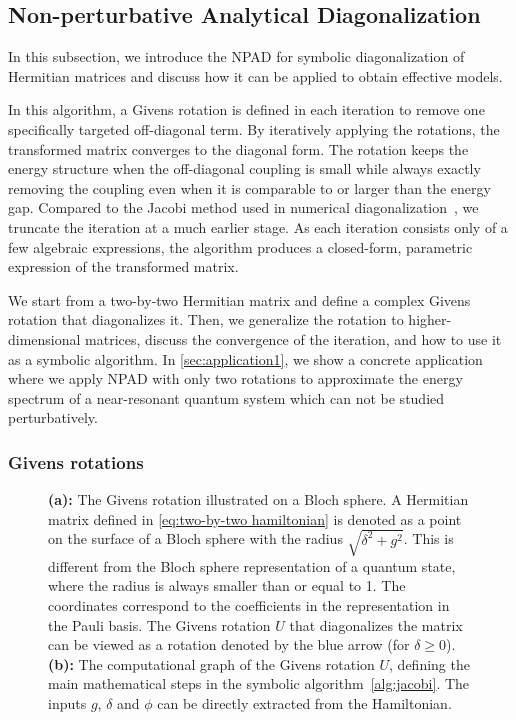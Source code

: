 \documentclass[%
 reprint,
 amsmath,amssymb,
 aps,
pra,
noeprint,
superscriptaddress,
]{revtex4-2}
\begin{document}
\subsection{Non-perturbative Analytical Diagonalization}

\label{sec:jacobi}
In this subsection, we introduce the NPAD for symbolic diagonalization of Hermitian matrices and discuss how it can be applied to obtain effective models.

In this algorithm, a Givens rotation is defined in each iteration to remove one specifically targeted off-diagonal term.
By iteratively applying the rotations, the transformed matrix converges to the diagonal form.
The rotation keeps the energy structure when the off-diagonal coupling is small while always exactly removing the coupling even when it is comparable to or larger than the energy gap.
Compared to the Jacobi method used in numerical diagonalization~\cite{jacobi1846, henrici1958, Forsythe1960}, we truncate the iteration at a much earlier stage.
As each iteration consists only of a few algebraic expressions, the algorithm produces a closed-form, parametric expression of the transformed matrix.


We start from a two-by-two Hermitian matrix and define a complex Givens rotation that diagonalizes it.
Then, we generalize the rotation to higher-dimensional matrices, discuss the convergence of the iteration, and how to use it as a symbolic algorithm.
In \cref{sec:application1}, we show a concrete application where we apply NPAD with only two rotations to approximate the energy spectrum of a near-resonant quantum system which can not be studied perturbatively.

\subsubsection{Givens rotations}
\begin{figure}
    \centering
    \caption{{\bf (a):} The Givens rotation illustrated on a Bloch sphere. A Hermitian matrix defined in \cref{eq:two-by-two hamiltonian} is denoted as a point on the surface of a Bloch sphere with the radius $\sqrt{\delta^2+g^2}$. This is different from the Bloch sphere representation of a quantum state, where the radius is always smaller than or equal to 1. The coordinates correspond to the coefficients in the representation in the Pauli basis.
    The Givens rotation $U$ that diagonalizes the matrix can be viewed as a rotation denoted by the blue arrow (for $\delta \ge 0$).
    {\bf (b):} The computational graph of the Givens rotation $U$, defining the main mathematical steps in the symbolic algorithm~\ref{alg:jacobi}. The inputs $g$, $\delta$ and $\phi$ can be directly extracted from the Hamiltonian. 
    }
\end{figure}
\end{document}
